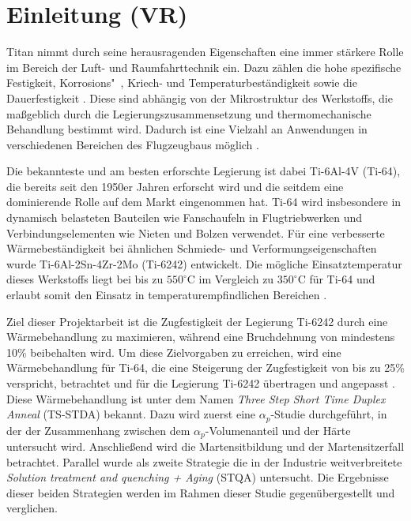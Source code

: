 \chapter{Einleitung (VR)} 

Titan nimmt durch seine herausragenden Eigenschaften eine immer stärkere Rolle im Bereich der Luft- und Raumfahrttechnik ein. Dazu zählen die hohe spezifische Festigkeit, Korrosions"~, Kriech- und Temperaturbeständigkeit sowie die Dauerfestigkeit \cite{Lutjering.2007}. Diese sind abhängig von der Mikrostruktur des Werkstoffs, die maßgeblich durch die Legierungszusammensetzung und thermomechanische Behandlung bestimmt wird. Dadurch ist eine Vielzahl an Anwendungen in verschiedenen Bereichen des Flugzeugbaus möglich \cite{M.J.Donachie.2010}.

Die bekannteste und am besten erforschte Legierung ist dabei Ti-6Al-4V (Ti-64), die bereits seit den 1950er Jahren erforscht wird und die seitdem eine dominierende Rolle auf dem Markt eingenommen hat. Ti-64 wird insbesondere in dynamisch belasteten Bauteilen wie Fanschaufeln in Flugtriebwerken und Verbindungselementen wie Nieten und Bolzen verwendet. 
Für eine verbesserte Wärmebeständigkeit bei ähnlichen Schmiede- und Verformungseigenschaften wurde Ti-6Al-2Sn-4Zr-2Mo (Ti-6242) entwickelt. Die mögliche Einsatztemperatur dieses Werkstoffs liegt bei bis zu $550^\circ $C im Vergleich zu $350^\circ$C für Ti-64 und erlaubt somit den Einsatz in temperaturempfindlichen Bereichen \cite{Lutjering.2007}.
 
Ziel dieser Projektarbeit ist die Zugfestigkeit der Legierung Ti-6242 durch eine Wärmebehandlung zu maximieren, während eine Bruchdehnung von mindestens 10\% beibehalten wird. Um diese Zielvorgaben zu erreichen, wird eine Wärmebehandlung für Ti-64, die eine Steigerung der Zugfestigkeit von bis zu 25\% verspricht, betrachtet und für die Legierung Ti-6242 übertragen und angepasst \cite{Morita.2005}. Diese Wärmebehandlung ist unter dem Namen \textit{Three Step Short Time Duplex Anneal} (TS-STDA) bekannt. Dazu wird zuerst eine $\alpha_p$-Studie durchgeführt, in der der Zusammenhang zwischen dem $\alpha_p$-Volumenanteil und der Härte untersucht wird. Anschließend wird die Martensitbildung und der Martensitzerfall betrachtet. Parallel wurde als zweite Strategie die in der Industrie weitverbreitete \textit{Solution treatment and quenching + Aging} (STQA) untersucht. Die Ergebnisse dieser beiden Strategien werden im Rahmen dieser Studie gegenübergestellt und verglichen.


